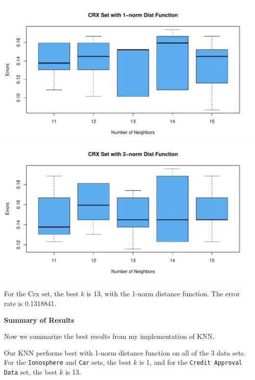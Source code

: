 \documentclass{article}
\newcommand{\code}[1]{\texttt{#1}}
\begin{document}
\begin{center}
  \includegraphics[width=0.9\linewidth]{Images/Prob2/Prob2-2-Crx-1norm.pdf}
  \includegraphics[width=0.9\linewidth]{Images/Prob2/Prob2-2-Crx-2norm.pdf}
\end{center}

For the Crx set, the best $k$ is 13, with the 1-norm distance function. The error rate is 0.1318841.
\bigskip \bigskip

\noindent\textbf{Summary of Results}
\bigskip

Now we summarize the best results from my implementation of KNN.

Our KNN performs best with 1-norm distance function on all of the 3 data sets. For the \code{Ionosphere} and \code{Car} sets, the best $k$ is 1, and for the \code{Credit Approval Data} set, the best $k$ is 13.
\bigskip
\end{document}

